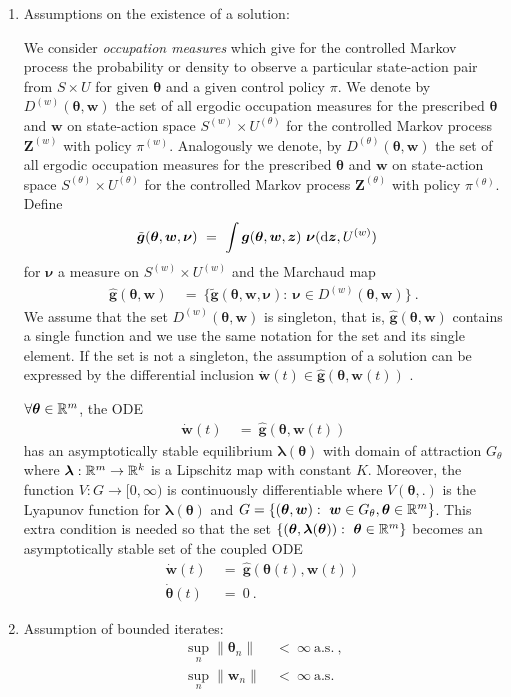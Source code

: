 \documentclass{article}
\newcommand\Bg{\bm{g}}
\newcommand\Bw{\bm{w}}
\newcommand\Bz{\bm{z}}
\newcommand\BZ{\bm{Z}}
\newcommand\Bla{\bm{\lambda}}
\newcommand\Bnu{\bm{\nu}}
\newcommand\Bth{\bm{\theta}}
\begin{document}
\begin{enumerate}[label=\textbf{(A\arabic*)}]
\item Assumptions on the existence of a solution:

We consider {\em occupation measures}
which give for
the controlled Markov process the probability or
density to observe a particular
state-action pair from $S \times U$
for given $\Bth$ and a given control policy $\pi$.
We denote by $D^{(w)}(\Bth,\Bw)$ the set of all ergodic occupation
measures
for the prescribed $\Bth$ and $\Bw$
on state-action space $S^{(w)} \times U^{(\theta)}$
for the controlled Markov process $\BZ^{(w)}$
with policy $\pi^{(w)}$.
Analogously we denote, by
$D^{(\theta)}(\Bth,\Bw)$ the set of all ergodic occupation measures
for the prescribed $\Bth$ and $\Bw$
on state-action space $S^{(\theta)} \times U^{(\theta)}$
for the controlled Markov process $\BZ^{(\theta)}$
with policy $\pi^{(\theta)}$.
Define
\begin{align}
\tilde{\Bg}(\Bth, \Bw, \Bnu) \ &= \ \int \Bg(\Bth,\Bw,\Bz) \ \Bnu(\Rd\Bz, U^{(w)})
\end{align}
for $\Bnu$ a measure on $S^{(w)}\times U^{(w)}$ and the Marchaud map
\begin{align}
\hat{\Bg}(\Bth,\Bw) \ &= \ \{\tilde{\Bg}(\Bth, \Bw, \Bnu): \  \Bnu \in
  D^{(w)}(\Bth, \Bw)\} \ .
\end{align}
We assume that the set $D^{(w)}(\Bth, \Bw)$ is singleton, that is,
$\hat{\Bg}(\Bth,\Bw)$ contains a single function and we use the same
notation for the set and its single element.
If the set is not a singleton,
the assumption of a solution can be expressed by the differential
inclusion
$\dot{\Bw}(t) \in \hat{\Bg}(\Bth,\Bw(t))$ \cite{Karmakar:17}.

$\forall \Bth \in \dR^m$, the ODE
\begin{align}
\dot{\Bw}(t) \ &= \ \hat{\Bg}(\Bth,\Bw(t))
\end{align}
has an asymptotically stable equilibrium $\Bla(\Bth)$
with domain of attraction $G_\theta$
where $\Bla :  \dR^m \to \dR^k$ is a Lipschitz map with constant $K$.
Moreover, the function $V: G \to
[0,\infty)$ is continuously differentiable where $V(\Bth,.)$ is the Lyapunov function
for $\Bla(\Bth)$ and $G=\{(\Bth,\Bw): \ \Bw \in G_\theta, \Bth \in \dR^m\}$. This extra condition is needed
so that the set $\{(\Bth,\Bla(\Bth)): \ \Bth \in \dR^m\}$ becomes an asymptotically stable set of the coupled ODE
\begin{align}
\dot{\Bw}(t) \ &= \ \hat{\Bg}(\Bth(t),\Bw(t)) \, \\
\dot{\Bth}(t) \ &= \ 0 \ .
\end{align}

\item Assumption of bounded iterates:
\begin{align}
\sup_n \| \Bth_n \| \ &< \ \infty \ \text{a.s.} \ , \\
\sup_n \| \Bw_n \| \ &< \ \infty \ \text{a.s.}
\end{align}

\end{enumerate}
\end{document}
